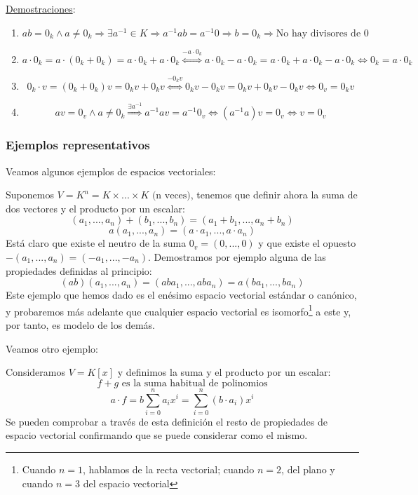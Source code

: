 \documentclass[10pt,a4paper,openright]{book}
\begin{document}
\underline{Demostraciones}:
\begin{enumerate}
\item 
$$ab=0_k\wedge a\neq 0_k\Rightarrow \exists a^{-1}\in K\Rightarrow a^{-1}ab=a^{-1}0\Rightarrow b=0_k\Rightarrow \mbox{No hay divisores de 0}$$

\item
$$a\cdot 0_k=a\cdot (0_k+0_k)=a\cdot 0_k+a\cdot 0_k\stackrel{-a\cdot 0_k}{\Leftrightarrow}a\cdot 0_k-a\cdot 0_k=a\cdot 0_k+a\cdot 0_k-a\cdot 0_k\Leftrightarrow 0_k=a\cdot 0_k$$

\item
$$0_k\cdot v=(0_k+0_k)v=0_kv+0_kv\stackrel{-0_kv}{\Leftrightarrow} 0_kv-0_kv=0_kv+0_kv-0_kv\Leftrightarrow 0_v=0_kv$$

\item
$$av=0_v\wedge a\neq 0_k\stackrel{\exists a^{-1}}{\Rightarrow} a^{-1}av=a^{-1}0_v\Leftrightarrow (a^{-1}a)v=0_v\Leftrightarrow v=0_v$$
\end{enumerate}

\subsubsection*{Ejemplos representativos}
Veamos algunos ejemplos de espacios vectoriales:\par
Suponemos $V=K^n=K\times ... \times K \mbox{ (n veces)}$, tenemos que definir ahora la suma de dos vectores y el producto por un escalar:
 $$(a_1, ..., a_n)+(b_1, ..., b_n)=(a_1+b_1, ..., a_n+ b_n)$$
 $$a(a_1, ..., a_n)=(a\cdot a_1, ..., a\cdot a_n)$$
Está claro que existe el neutro de la suma $0_v=(0,...,0)$ y que existe el opuesto $-(a_1, ..., a_n)=(-a_1, ..., -a_n)$. Demostramos por ejemplo alguna de las propiedades definidas al principio:
$$(ab)(a_1, ..., a_n)=(aba_1, ..., aba_n)=a(ba_1, ..., ba_n)$$
Este ejemplo que hemos dado es el enésimo espacio vectorial estándar o canónico, y probaremos más adelante que cualquier espacio vectorial es isomorfo\footnote{Cuando $n=1$, hablamos de la recta vectorial; cuando $n=2$, del plano y cuando $n=3$ del espacio vectorial} a este y, por tanto, es modelo de los demás.\par

\vspace{0.35cm}

Veamos otro ejemplo:\par
Consideramos $V=K[x]$ y definimos la suma y el producto por un escalar:
$$f+g\mbox{ es la suma habitual de polinomios}$$
$$a\cdot f=b\sum_{i=0}^n a_ix^i=\sum_{i=0}^n (b\cdot a_i)x^i$$
Se pueden comprobar a través de esta definición el resto de propiedades de espacio vectorial confirmando que se puede considerar como el mismo.
\end{document}

